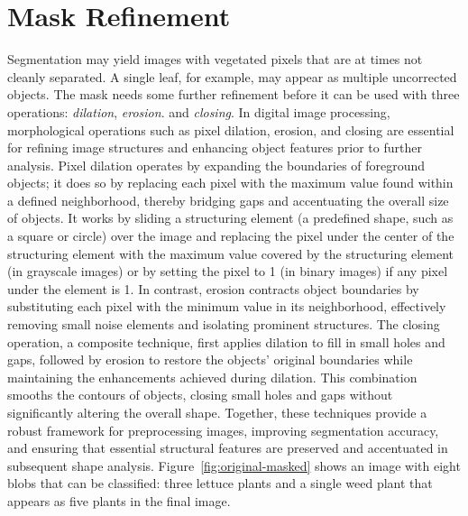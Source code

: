 \documentclass[letterpaper]{report}
\begin{document}
{\section{Mask Refinement}
Segmentation may yield images with vegetated pixels that are at times not cleanly separated. A single leaf, for example, may appear as multiple uncorrected objects. The mask needs some further refinement before it can be used with three operations: \textit{dilation}, \textit{erosion}. and \textit{closing}. In digital image processing, morphological operations such as pixel dilation, erosion, and closing are essential for refining image structures and enhancing object features prior to further analysis. Pixel dilation operates by expanding the boundaries of foreground objects; it does so by replacing each pixel with the maximum value found within a defined neighborhood, thereby bridging gaps and accentuating the overall size of objects. It works by sliding a structuring element (a predefined shape, such as a square or circle) over the image and replacing the pixel under the center of the structuring element with the maximum value covered by the structuring element (in grayscale images) or by setting the pixel to 1 (in binary images) if any pixel under the element is 1. In contrast, erosion contracts object boundaries by substituting each pixel with the minimum value in its neighborhood, effectively removing small noise elements and isolating prominent structures. The closing operation, a composite technique, first applies dilation to fill in small holes and gaps, followed by erosion to restore the objects' original boundaries while maintaining the enhancements achieved during dilation.  This combination smooths the contours of objects, closing small holes and gaps without significantly altering the overall shape. Together, these techniques provide a robust framework for preprocessing images, improving segmentation accuracy, and ensuring that essential structural features are preserved and accentuated in subsequent shape analysis.
Figure~\ref{fig:original-masked} shows an image with  eight blobs that can be classified: three lettuce plants and a single weed plant that appears as five plants in the final image.


}
\end{document}
